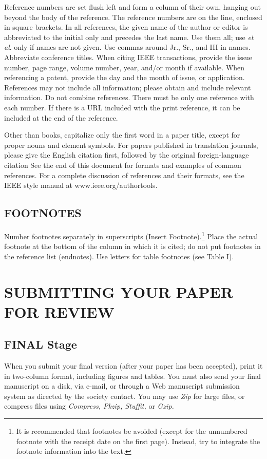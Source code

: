 \documentclass{ieeeojpel}
\begin{document}
Reference numbers are set flush left and form a column of their own, hanging 
out beyond the body of the reference. The reference numbers are on the line, 
enclosed in square brackets. In all references, the given name of the author 
or editor is abbreviated to the initial only and precedes the last name. Use 
them all; use \textit{et al}. only if names are not given. Use commas around Jr., Sr., and 
III in names. Abbreviate conference titles. When citing IEEE transactions, 
provide the issue number, page range, volume number, year, and/or month if 
available. When referencing a patent, provide the day and the month of 
issue, or application. References may not include all information; please 
obtain and include relevant information. Do not combine references. There 
must be only one reference with each number. If there is a URL included with 
the print reference, it can be included at the end of the reference. 

Other than books, capitalize only the first word in a paper title, except 
for proper nouns and element symbols. For papers published in translation 
journals, please give the English citation first, followed by the original 
foreign-language citation See the end of this document for formats and 
examples of common references. For a complete discussion of references and 
their formats, see the IEEE style manual at www.ieee.org/authortools.


\subsection{FOOTNOTES}
Number footnotes separately in superscripts (Insert\textbar 
Footnote).\footnote{It is recommended that footnotes be avoided (except for 
the unnumbered footnote with the receipt date on the first page). Instead, 
try to integrate the footnote information into the text.} Place the actual 
footnote at the bottom of the column in which it is cited; do not put 
footnotes in the reference list (endnotes). Use letters for table footnotes 
(see Table I). 

\section{SUBMITTING YOUR PAPER FOR REVIEW}

\subsection{FINAL Stage}
When you submit your final version (after your paper has been accepted), 
print it in two-column format, including figures and tables. You must also 
send your final manuscript on a disk, via e-mail, or through a Web 
manuscript submission system as directed by the society contact. You may use 
\textit{Zip} for large files, or compress files using \textit{Compress, Pkzip, Stuffit,} or \textit{Gzip.} 
\end{document}
